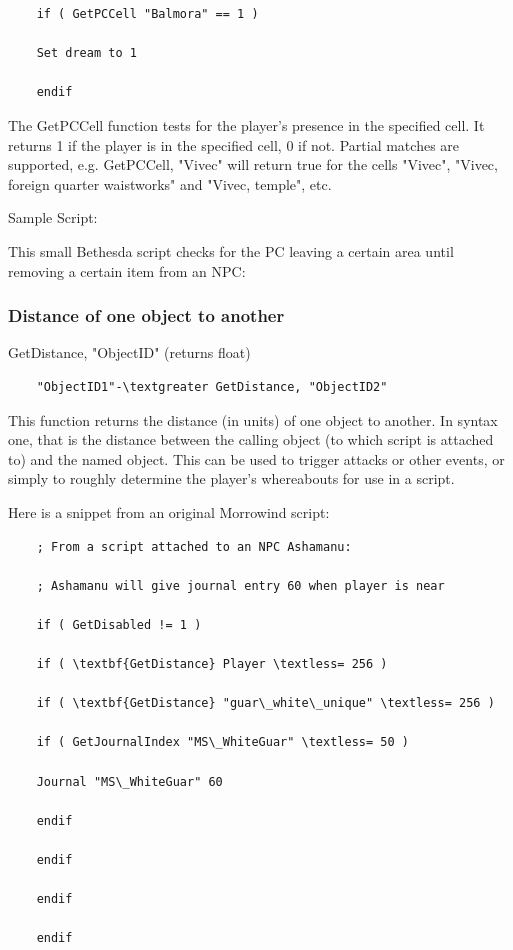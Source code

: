\begin{lstlisting}
	if ( GetPCCell "Balmora" == 1 )
	
	Set dream to 1
	
	endif
\end{lstlisting}

The GetPCCell function tests for the player's presence in the specified
cell. It returns 1 if the player is in the specified cell, 0 if not.
Partial matches are supported, e.g. GetPCCell, "Vivec" will return true
for the cells "Vivec", "Vivec, foreign quarter waistworks" and "Vivec,
temple", etc.

Sample Script:

This small Bethesda script checks for the PC leaving a certain area
until removing a certain item from an NPC:



\hypertarget{distance-of-one-object-to-another}{%
\subsubsection{Distance of one object to
another}\label{distance-of-one-object-to-another}}

GetDistance, "ObjectID" (returns float)

\begin{lstlisting}
	"ObjectID1"-\textgreater GetDistance, "ObjectID2"
\end{lstlisting}

This function returns the distance (in units) of one object to another.
In syntax one, that is the distance between the calling object (to which
script is attached to) and the named object. This can be used to trigger
attacks or other events, or simply to roughly determine the player's
whereabouts for use in a script.

Here is a snippet from an original Morrowind script:

\begin{lstlisting}
	; From a script attached to an NPC Ashamanu:
	
	; Ashamanu will give journal entry 60 when player is near
	
	if ( GetDisabled != 1 )
	
	if ( \textbf{GetDistance} Player \textless= 256 )
	
	if ( \textbf{GetDistance} "guar\_white\_unique" \textless= 256 )
	
	if ( GetJournalIndex "MS\_WhiteGuar" \textless= 50 )
	
	Journal "MS\_WhiteGuar" 60
	
	endif
	
	endif
	
	endif
	
	endif
\end{lstlisting}

